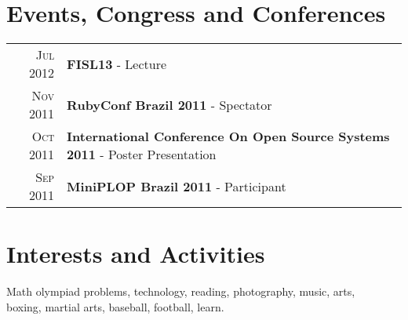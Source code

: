 \documentclass[a4paper,10pt]{article} %
\begin{document}
\section{Events, Congress and Conferences}

\begin{tabular}{rl}
\textsc{Jul} 2012 & \textbf{FISL13} - Lecture\\

\textsc{Nov} 2011 & \textbf{RubyConf Brazil 2011} - Spectator\\
\textsc{Oct} 2011 & \textbf{International Conference On Open Source Systems 2011} - Poster Presentation\\
\textsc{Sep} 2011 & \textbf{MiniPLOP Brazil 2011} - Participant


\end{tabular}


\section{Interests and Activities}

Math olympiad problems, technology, reading, photography, music, arts,\\
boxing, martial arts, baseball, football, learn.

\end{document}
